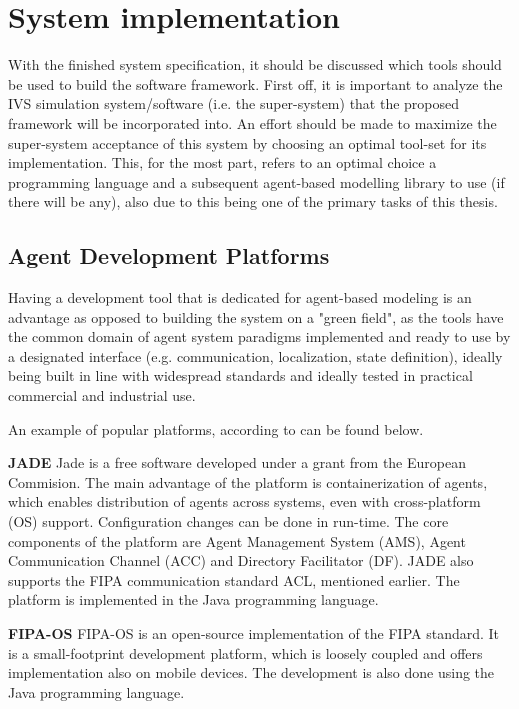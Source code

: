 \documentclass[main.tex]{subfiles}
\begin{document}
\section{System implementation}

With the finished system specification, it should be discussed which tools should be used to build the software framework. 
First off, it is important to analyze the IVS simulation system/software (i.e. the super-system) that
the proposed framework will be incorporated into. An effort should be made to maximize the super-system acceptance of 
this system by choosing an optimal tool-set for its implementation. This, for the most part,
refers to an optimal choice a programming language and a subsequent agent-based modelling
library to use (if there will be any), also due to this being one of the primary tasks of this thesis. 

\subsection{Agent Development Platforms}

Having a development tool that is dedicated for agent-based modeling is an advantage as opposed to building the 
system on a "green field", as the tools have the common domain of agent system paradigms implemented and ready 
to use by a designated interface (e.g. communication, localization, state definition), ideally being built in line 
with widespread standards and ideally tested in practical commercial and industrial use. 

An example of popular platforms, according to \cite{Binder2022} can be found below. 

\textbf{JADE} \smallskip \newline 
Jade is a free software developed under a grant from the European Commision. The main advantage of the 
platform is containerization of agents, which enables distribution of agents across systems, even 
with cross-platform (OS) support. Configuration changes can be done in run-time. The core components of 
the platform are Agent Management System (AMS), Agent Communication Channel (ACC) and Directory Facilitator (DF). 
JADE also supports the FIPA communication standard ACL, mentioned earlier. The platform is implemented in 
the Java programming language.

\textbf{FIPA-OS} \smallskip \newline 
FIPA-OS is an open-source implementation of the FIPA standard. It is a small-footprint development platform, 
which is loosely coupled and offers implementation also on mobile devices. The development is also done 
using the Java programming language. 
\end{document}
